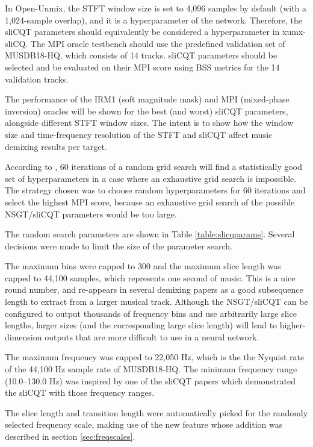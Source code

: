 \documentclass[report.tex]{subfiles}
\begin{document}
In Open-Unmix, the STFT window size is set to 4,096 samples by default (with a 1,024-sample overlap), and it is a hyperparameter of the network. Therefore, the sliCQT parameters should equivalently be considered a hyperparameter in xumx-sliCQ. The MPI oracle testbench should use the predefined validation set of MUSDB18-HQ, which consists of 14 tracks. sliCQT parameters should be selected and be evaluated on their MPI score using BSS metrics for the 14 validation tracks.

The performance of the IRM1 (soft magnitude mask) and MPI (mixed-phase inversion) oracles will be shown for the best (and worst) sliCQT parameters, alongside different STFT window sizes. The intent is to show how the window size and time-frequency resolution of the STFT and sliCQT affect music demixing results per target.

According to \textcite{randomgrid}, 60 iterations of a random grid search will find a statistically good set of hyperparameters in a case where an exhaustive grid search is impossible. The strategy chosen was to choose random hyperparameters for 60 iterations and select the highest MPI score, because an exhaustive grid search of the possible NSGT/sliCQT parameters would be too large. 

The random search parameters are shown in Table \ref{table:slicqparams}. Several decisions were made to limit the size of the parameter search.

The maximum bins were capped to 300 and the maximum slice length was capped to 44,100 samples, which represents one second of music. This is a nice round number, and re-appears in several demixing papers \parencite{plumbley1, plumbley2, demucs} as a good subsequence length to extract from a larger musical track. Although the NSGT/sliCQT can be configured to output thousands of frequency bins and use arbitrarily large slice lengths, larger sizes (and the corresponding large slice length) will lead to higher-dimension outputs that are more difficult to use in a neural network.

The maximum frequency was capped to 22,050 Hz, which is the the Nyquist rate of the 44,100 Hz sample rate of MUSDB18-HQ. The minimum frequency range (10.0--130.0 Hz) was inspired by one of the sliCQT papers \parencite{slicq} which demonstrated the sliCQT with those frequency ranges.

The slice length and transition length were automatically picked for the randomly selected frequency scale, making use of the new feature whose addition was described in section \ref{sec:freqscales}.
\end{document}
